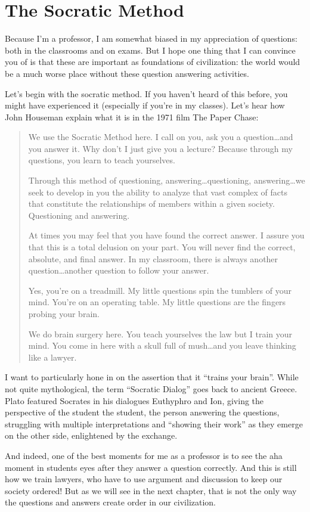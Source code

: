 \section{The Socratic Method}

Because I’m a professor, I am somewhat biased in my appreciation of questions: both in the classrooms and on exams.  But I hope one thing that I can convince you of is that these are important as foundations of civilization: the world would be a much worse place without these question answering activities.


Let’s begin with the socratic method.  If you haven’t heard of this before, you might have experienced it (especially if you’re in my classes).  Let’s hear how John Houseman explain what it is in the 1971 film The Paper Chase:
\begin{quote}
We use the Socratic Method here.  I call on you, ask you a question\dots and you answer it.  Why don't I just give you a lecture?  Because through my questions, you learn to teach yourselves.

Through this method of questioning, answering\dots questioning, answering\dots we seek to develop in you
the ability to analyze that vast complex of facts that constitute the relationships of members within a given society.  Questioning and answering.

At times you may feel that you have found the correct answer. I assure you that this is a total delusion on your part. You will never find the correct, absolute, and final answer.  In my classroom, there is always another question\dots another question to follow your answer.

Yes, you're on a treadmill.  My little questions spin the tumblers of your mind. You're on an operating table. My little questions are the fingers probing your brain.

We do brain surgery here.  You teach yourselves the law but I train your mind.  You come in here with a skull full of mush\dots and you leave thinking like a lawyer.
\end{quote}

I want to particularly hone in on the assertion that it ``trains your brain''.  While not quite mythological, the term ``Socratic Dialog'' goes back to ancient Greece.  Plato featured Socrates in his dialogues Euthyphro and Ion, giving the perspective of the student the student, the person answering the questions, struggling with multiple interpretations and ``showing their work'' as they emerge on the other side, enlightened by the exchange.

And indeed, one of the best moments for me as a professor is to see the aha moment in students eyes after they answer a question correctly.  And this is still how we train lawyers, who have to use argument and discussion to keep our society ordered!  But as we will see in the next chapter, that is not the only way the questions and answers create order in our civilization.





